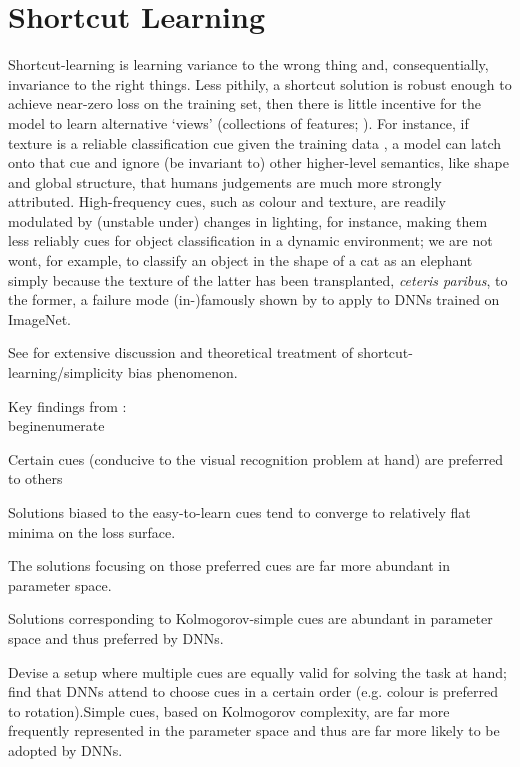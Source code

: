 \section{Shortcut Learning}

Shortcut-learning is learning variance to the wrong thing and, consequentially, invariance to the
right things.
%
Less pithily, a shortcut solution is robust enough to achieve near-zero loss on the training set,
then there is little incentive for the model to learn alternative `views' (collections of features;
\cite{allen2020towards}).
%
For instance, if texture is a reliable classification cue given the training data
\cite{geirhos2018imagenet}, a model can latch onto that cue and ignore (be invariant to) other
higher-level semantics, like shape and global structure, that humans judgements are much more
strongly attributed.
%
High-frequency cues, such as colour and texture, are readily modulated by (unstable under) changes
in lighting, for instance, making them less reliably cues for object classification in a dynamic
environment; we are not wont, for example, to classify an object in the shape of a cat as an
elephant simply because the texture of the latter has been transplanted, \emph{ceteris paribus}, to
the former, a failure mode (in-)famously shown by \cite{geirhos2018imagenet} to apply to DNNs
trained on ImageNet.

See \cite{valle2018deep, geirhos2020shortcut, scimeca2021shortcut, shah2020pitfalls} for extensive discussion and
theoretical treatment of shortcut-learning/simplicity bias phenomenon.

Key findings from \cite{scimeca2021shortcut}:
\\begin{enumerate}
         \item Certain cues (conducive to the visual recognition problem at hand) are preferred to
           others
         \item Solutions biased to the easy-to-learn cues tend to converge to relatively flat minima
           on the loss surface.
         \item The solutions focusing on those preferred cues are far more abundant in parameter
           space.
         \item Solutions corresponding to Kolmogorov-simple cues are abundant in parameter space
           and thus preferred by DNNs.
          \item Devise a setup where multiple cues are equally valid for solving the task at hand;
            find that DNNs attend to choose cues in a certain order (e.g. colour is preferred to
            rotation).Simple cues, based on Kolmogorov complexity, are far more frequently
            represented in the parameter space and thus are far more likely to be adopted by DNNs.
          
